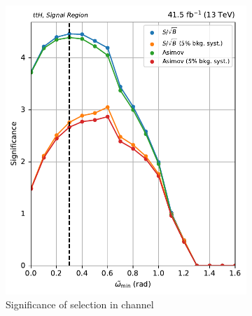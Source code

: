 \begin{figure}[htbp]
    \begin{subfigure}[b]{0.4\textwidth}
        \includegraphics[width=\textwidth]{figures/category_optimisations/with_mindphi_cut/significance_ttH_min_omega_tilde_all.pdf}
        \caption{Significance of selection in \ttH channel}
    \end{subfigure}
    \hspace{0.1\textwidth}
    \begin{subfigure}[b]{0.4\textwidth}

\end{subfigure}
\end{figure}
